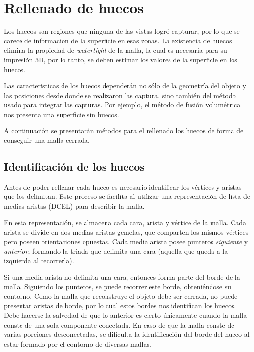 \section{Rellenado de huecos}
Los huecos son regiones que ninguna de las vistas logró capturar,
por lo que se carece de información de la superficie en esas zonas.
La existencia de huecos elimina la propiedad de \emph{watertight} de la malla,
la cual es necesaria para su impresión 3D,
por lo tanto, se deben estimar los valores de la superficie en los huecos.


Las características de los huecos dependerán no sólo de la geometría del objeto y las
posiciones desde donde se realizaron las captura, sino también del método usado
para integrar las capturas.
Por ejemplo, el método de fusión volumétrica nos presenta una superficie sin huecos.


A continuación se presentarán métodos para el rellenado los huecos de forma de conseguir una malla cerrada.

\subsection{Identificación de los huecos}
Antes de poder rellenar cada hueco es necesario identificar los vértices y aristas que los delimitan.
Este proceso se facilita al utilizar una representación
de lista de medias aristas (DCEL) para describir la malla.

En esta representación, se almacena cada cara, arista y vértice de la malla.
Cada arista se divide en dos medias aristas gemelas, que comparten los mismos vértices
pero poseen orientaciones opuestas.
Cada media arista posee punteros \emph{siguiente} y \emph{anterior},
formando la triada que delimita una cara (aquella que queda a la izquierda al recorrerla).

Si una media arista no delimita una cara, entonces forma parte del borde de la malla.
Siguiendo los punteros, se puede recorrer este borde, obteniéndose su contorno.
Como la malla que reconstruye el objeto debe ser cerrada, no puede presentar aristas de borde,
por lo cual estos bordes nos identifican los huecos.
Debe hacerse la salvedad de que lo anterior es cierto únicamente cuando la malla conste
de una sola componente conectada.
En caso de que la malla conste de varias porciones desconectadas,
se dificulta la identificación del borde del hueco al estar formado por el contorno de diversas mallas.



